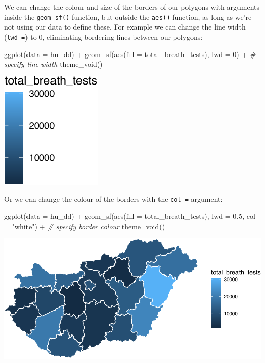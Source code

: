 \documentclass[
]{book}
\newenvironment{Shaded}{\begin{snugshade}}{\end{snugshade}}
\newcommand{\AttributeTok}[1]{\textcolor[rgb]{0.77,0.63,0.00}{#1}}
\newcommand{\CommentTok}[1]{\textcolor[rgb]{0.56,0.35,0.01}{\textit{#1}}}
\newcommand{\DecValTok}[1]{\textcolor[rgb]{0.00,0.00,0.81}{#1}}
\newcommand{\FloatTok}[1]{\textcolor[rgb]{0.00,0.00,0.81}{#1}}
\newcommand{\FunctionTok}[1]{\textcolor[rgb]{0.00,0.00,0.00}{#1}}
\newcommand{\NormalTok}[1]{#1}
\newcommand{\SpecialCharTok}[1]{\textcolor[rgb]{0.00,0.00,0.00}{#1}}
\newcommand{\StringTok}[1]{\textcolor[rgb]{0.31,0.60,0.02}{#1}}
\begin{document}
We can change the colour and size of the borders of our polygons with arguments inside the \texttt{geom\_sf()} function, but outside the \texttt{aes()} function, as long as we're not using our data to define these. For example we can change the line width (\texttt{lwd\ =}) to 0, eliminating bordering lines between our polygons:

\begin{Shaded}
\begin{Highlighting}[]
\FunctionTok{ggplot}\NormalTok{(}\AttributeTok{data =}\NormalTok{ hu\_dd) }\SpecialCharTok{+} 
  \FunctionTok{geom\_sf}\NormalTok{(}\FunctionTok{aes}\NormalTok{(}\AttributeTok{fill =}\NormalTok{ total\_breath\_tests), }
          \AttributeTok{lwd =} \DecValTok{0}\NormalTok{) }\SpecialCharTok{+}  \CommentTok{\# specify line width}
  \FunctionTok{theme\_void}\NormalTok{()}
\end{Highlighting}
\end{Shaded}

\includegraphics{crime_mapping_files/figure-latex/themmapnobord-1.pdf}

Or we can change the colour of the borders with the \texttt{col\ =} argument:

\begin{Shaded}
\begin{Highlighting}[]
\FunctionTok{ggplot}\NormalTok{(}\AttributeTok{data =}\NormalTok{ hu\_dd) }\SpecialCharTok{+} 
  \FunctionTok{geom\_sf}\NormalTok{(}\FunctionTok{aes}\NormalTok{(}\AttributeTok{fill =}\NormalTok{ total\_breath\_tests), }
          \AttributeTok{lwd =} \FloatTok{0.5}\NormalTok{, }
          \AttributeTok{col =} \StringTok{"white"}\NormalTok{) }\SpecialCharTok{+} \CommentTok{\# specify border colour}
  \FunctionTok{theme\_void}\NormalTok{()}
\end{Highlighting}
\end{Shaded}

\includegraphics{crime_mapping_files/figure-latex/themmapwhitebord-1.pdf}
\end{document}
